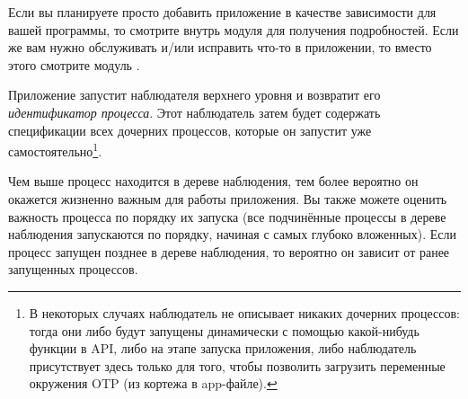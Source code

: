 \documentclass[11pt, oneside]{book}   	%
\begin{document}
Если вы планируете просто добавить приложение в качестве зависимости для вашей программы, то смотрите внутрь модуля  для получения подробностей. Если же вам нужно обслуживать и/или исправить что-то в приложении, то вместо этого смотрите модуль .

Приложение запустит наблюдателя верхнего уровня и возвратит его \emph{идентификатор процесса}. Этот наблюдатель затем будет содержать спецификации всех дочерних процессов, которые он запустит уже самостоятельно\footnote{В некоторых случаях наблюдатель не описывает никаких дочерних процессов: тогда они либо будут запущены динамически с помощью какой-нибудь функции в API, либо на этапе запуска приложения, либо наблюдатель присутствует здесь только для того, чтобы позволить загрузить переменные окружения OTP (из кортежа  в app-файле).}.

Чем выше процесс находится в дереве наблюдения, тем более вероятно он окажется жизненно важным для работы приложения. Вы также можете оценить важность процесса по порядку их запуска (все подчинённые процессы в дереве наблюдения запускаются по порядку, начиная с самых глубоко вложенных). Если процесс запущен позднее в дереве наблюдения, то вероятно он зависит от ранее запущенных процессов.
\end{document}
